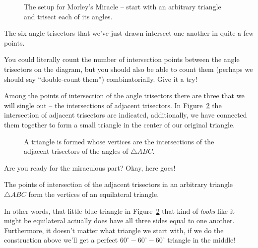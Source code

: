 \begin{figure}[!hbtp] 
\begin{center}

\end{center}
\caption[The setup for Morley's Miracle.]{The setup for Morley's %
Miracle -- start with an arbitrary triangle and trisect each of %
its angles.}
\label{fig:morley_setup}
\end{figure}
 
The six angle trisectors that we've just drawn intersect one another
in quite a few points.

\begin{exer}
You could literally count the number of intersection points between the
angle trisectors on the diagram, but you should also be able to count them
(perhaps we should say ``double-count them'') combinatorially.  Give it 
a try!
\end{exer}

Among the points of intersection of the angle trisectors there are three
that we will single out -- the intersections of adjacent trisectors.
In Figure~\ref{fig:morley_1st_triangle} the intersection of adjacent trisectors
are indicated, additionally, we have connected them together to form a 
small triangle in the center of our original triangle.

\clearpage

\begin{figure}[!hbtp] 
\begin{center}

\end{center}
\caption[The first Morley triangle.]{A triangle is formed whose vertices %
are the intersections of the adjacent trisectors of the angles of %
${\triangle}ABC$.}
\label{fig:morley_1st_triangle}
\end{figure}
  


Are you ready for the miraculous part?  Okay, here goes!

\begin{thm}
The points of intersection of the adjacent trisectors in an arbitrary
triangle ${\triangle}ABC$ form the vertices of an equilateral triangle.
\end{thm}

In other words, that little blue triangle in 
Figure~\ref{fig:morley_1st_triangle}
that kind of \emph{looks} like it might be equilateral actually does have
all three sides equal to one another.  Furthermore, it doesn't matter what
triangle we start with, if we do the construction above we'll get
a perfect $60^\circ - 60^\circ - 60^\circ$ triangle in the middle!

